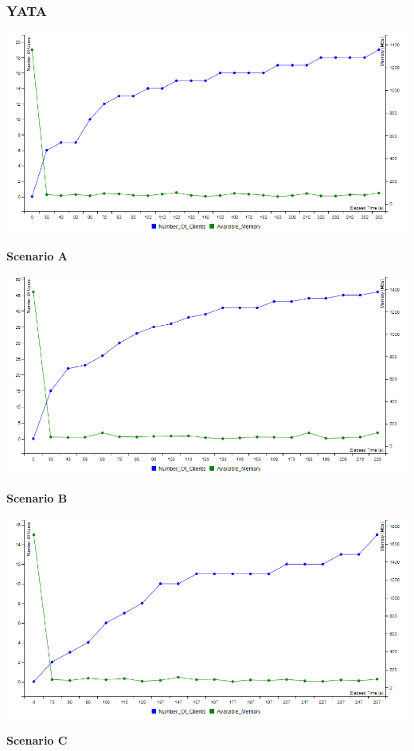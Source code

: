 \documentclass[12pt]{article}
\begin{document}
  \subsubsection{YATA}
  \begin{center}
    \includegraphics[scale=0.48]{yjs_users_S1.png}

    \textbf{Scenario A}
    
    \includegraphics[scale=0.48]{yjs_users_S2.png}
    
    \textbf{Scenario B}
    
    \includegraphics[scale=0.48]{yjs_users_S3.png}
    
    \textbf{Scenario C}

  \end{center}
\end{document}
